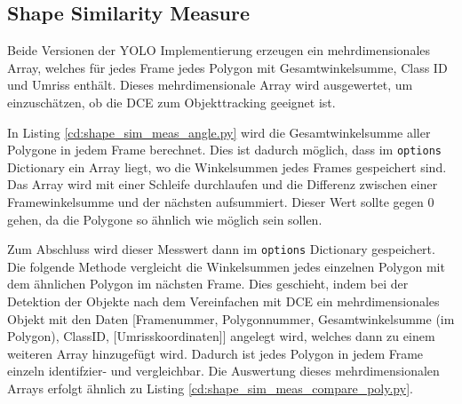 \subsection{Shape Similarity Measure}{
	\label{py:Shape_Sim_Meas}
	Beide Versionen der YOLO Implementierung erzeugen ein mehrdimensionales Array, welches für jedes Frame jedes Polygon mit Gesamtwinkelsumme, Class ID und Umriss enthält. Dieses mehrdimensionale Array wird ausgewertet, um einzuschätzen, ob die DCE zum Objekttracking geeignet ist. 

	In Listing \ref{cd:shape_sim_meas_angle.py} wird die Gesamtwinkelsumme aller Polygone in jedem Frame berechnet. Dies ist dadurch möglich, dass im \lstinline|options| Dictionary ein Array liegt, wo die Winkelsummen jedes Frames gespeichert sind. Das Array wird mit einer Schleife durchlaufen und die Differenz zwischen einer Framewinkelsumme und der nächsten aufsummiert. Dieser Wert sollte gegen 0 gehen, da die Polygone so ähnlich wie möglich sein sollen.
	
	Zum Abschluss wird dieser Messwert dann im \lstinline|options| Dictionary gespeichert.\\
	Die folgende Methode vergleicht die Winkelsummen jedes einzelnen Polygon mit dem ähnlichen Polygon im nächsten Frame. Dies geschieht, indem bei der Detektion der Objekte nach dem Vereinfachen mit DCE ein mehrdimensionales Objekt mit den Daten [Framenummer, Polygonnummer, Gesamtwinkelsumme (im Polygon), ClassID, [Umrisskoordinaten]] angelegt wird, welches dann zu einem weiteren Array hinzugefügt wird. Dadurch ist jedes Polygon in jedem Frame einzeln identifzier- und vergleichbar. 
	Die Auswertung dieses mehrdimensionalen Arrays erfolgt ähnlich zu Listing \ref{cd:shape_sim_meas_compare_poly.py}.\\

}
